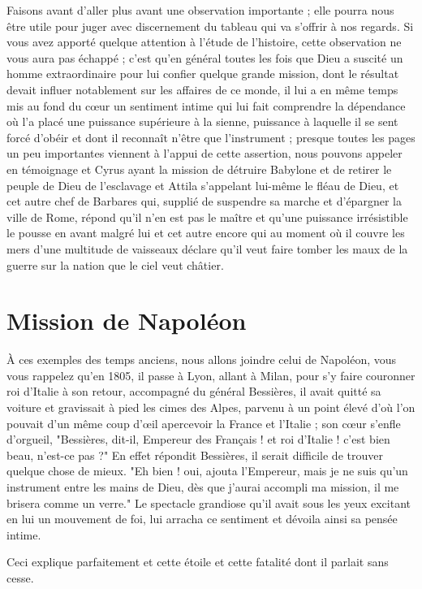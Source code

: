 \documentclass[11pt,a4paper]{report}
\begin{document}
Faisons avant d'aller plus avant une observation importante ; elle pourra nous être utile pour juger avec discernement du tableau qui va s'offrir à nos regards. Si vous avez apporté quelque attention à l'étude de l'histoire, cette observation ne vous aura pas échappé ; c'est qu'en général toutes les fois que Dieu a suscité un homme extraordinaire pour lui confier quelque grande mission, dont le résultat devait influer notablement sur les affaires de ce monde, il lui a en même temps mis au fond du cœur un sentiment intime qui lui fait comprendre la dépendance où l'a placé une puissance supérieure à la sienne, puissance à laquelle il se sent forcé d'obéir et dont il reconnaît n'être que l'instrument ; presque toutes les pages un peu importantes viennent à l'appui de cette assertion, nous pouvons appeler en témoignage et Cyrus ayant la mission de détruire Babylone et de retirer le peuple de Dieu de l'esclavage et Attila s'appelant lui-même le fléau de Dieu, et cet autre chef de Barbares qui, supplié de suspendre sa marche et d'épargner la ville de Rome, répond qu'il n'en est pas le maître et qu'une puissance irrésistible le pousse en avant malgré lui et cet autre encore qui au moment où il couvre les mers d'une multitude de vaisseaux déclare qu'il veut faire tomber les maux de la guerre sur la nation que le ciel veut châtier.

\section*{Mission de Napoléon}

À ces exemples des temps anciens, nous allons joindre celui de Napoléon, vous vous rappelez qu'en 1805, il passe à Lyon, allant à Milan, pour s'y faire couronner roi d'Italie à son retour, accompagné du général Bessières, il avait quitté sa voiture et gravissait à pied les cimes des Alpes, parvenu à un point élevé d'où l'on pouvait d'un même coup d'œil apercevoir la France et l'Italie ; son cœur s'enfle d'orgueil, "Bessières, dit-il, Empereur des Français ! et roi d'Italie ! c'est bien beau, n'est-ce pas ?" En effet répondit Bessières, il serait difficile de trouver quelque chose de mieux. "Eh bien ! oui, ajouta l'Empereur, mais je ne suis qu'un instrument entre les mains de Dieu, dès que j'aurai accompli ma mission, il me brisera comme un verre." Le spectacle grandiose qu'il avait sous les yeux excitant en lui un mouvement de foi, lui arracha ce sentiment et dévoila ainsi sa pensée intime.

Ceci explique parfaitement et cette étoile et cette fatalité dont il parlait sans cesse.
\end{document}
